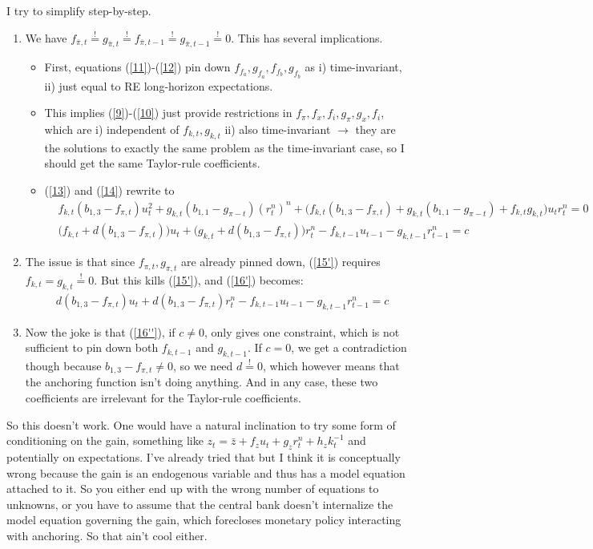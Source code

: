 \documentclass[11pt]{article}
\renewcommand{\[}{\begin{equation}}
\renewcommand{\]}{\end{equation}}
\begin{document}
I try to simplify step-by-step. 
\begin{enumerate}
\item We have $f_{\bar{\pi},t}\stackrel{!}{=}g_{\bar{\pi},t} \overset{!}{=} f_{\bar{\pi},t-1}\stackrel{!}{=}g_{\bar{\pi},t-1} \overset{!}{=} 0$. This has several implications. 
\begin{itemize}
\item First, equations (\ref{11})-(\ref{12}) pin down $f_{f_a}, g_{f_a}, f_{f_b}, g_{f_b}$ as i) time-invariant, ii) just equal to RE long-horizon expectations. 
\item This implies (\ref{9})-(\ref{10}) just provide restrictions in $f_{\pi}, f_x, f_i, g_{\pi}, g_x, f_i$, which are i) independent of $f_{k,t}, g_{k,t}$ ii) also time-invariant $\rightarrow$ they are the solutions to exactly the same problem as the time-invariant case, so I should get the same Taylor-rule coefficients.
\item (\ref{13}) and (\ref{14}) rewrite to
\begin{align}
& f_{k,t}(b_{1,3}-f_{\pi,t})u_t^2 + g_{k,t}(b_{1,1}-g_{\pi-t})(r_t^n)^n + \bigg(f_{k,t}(b_{1,3}-f_{\pi,t}) +  g_{k,t}(b_{1,1}-g_{\pi-t}) + f_{k,t}g_{k,t} \bigg)u_tr_t^n = 0 \tag{15'} \label{15'}\\
& \bigg(f_{k,t} + d(b_{1,3}-f_{\pi,t}) \bigg)u_t + \bigg(g_{k,t} + d(b_{1,3}-f_{\pi,t})\bigg)r_t^n -f_{k,t-1}u_{t-1} - g_{k,t-1}r_{t-1}^n = c\tag{16'} \label{16'}
\end{align} 
\end{itemize}
\item The issue is that since $f_{\pi,t}, g_{\pi,t}$ are already pinned down, (\ref{15'}) requires $f_{k,t}=g_{k,t} \overset{!}{=} 0$. But this kills (\ref{15'}), and (\ref{16'}) becomes:
\begin{align}
& d(b_{1,3}-f_{\pi,t}) u_t + d(b_{1,3}-f_{\pi,t})r_t^n -f_{k,t-1}u_{t-1} - g_{k,t-1}r_{t-1}^n = c\tag{16''} \label{16''}
\end{align} 
\item Now the joke is that (\ref{16''}), if $c \neq 0$, only gives one constraint, which is not sufficient to pin down both $f_{k,t-1}$ and $g_{k,t-1}$. If $c=0$, we get a contradiction though because $b_{1,3}-f_{\pi,t} \neq 0$, so we need $d \overset{!}{=}0$, which however means that the anchoring function isn't doing anything.  And in any case, these two coefficients are irrelevant for the Taylor-rule coefficients.
\end{enumerate}

So this doesn't work. One would have a natural inclination to try some form of conditioning on the gain, something like $z_t = \bar{z} + f_z u_t + g_z r_t^n + h_z k^{-1}_t$ and potentially on expectations. I've already tried that but I think it is conceptually wrong because the gain is an endogenous variable and thus has a model equation attached to it. So you either end up with the wrong number of equations to unknowns, or you have to assume that the central bank doesn't internalize the model equation governing the gain, which forecloses monetary policy interacting with anchoring. So that ain't cool either. 
\end{document}

